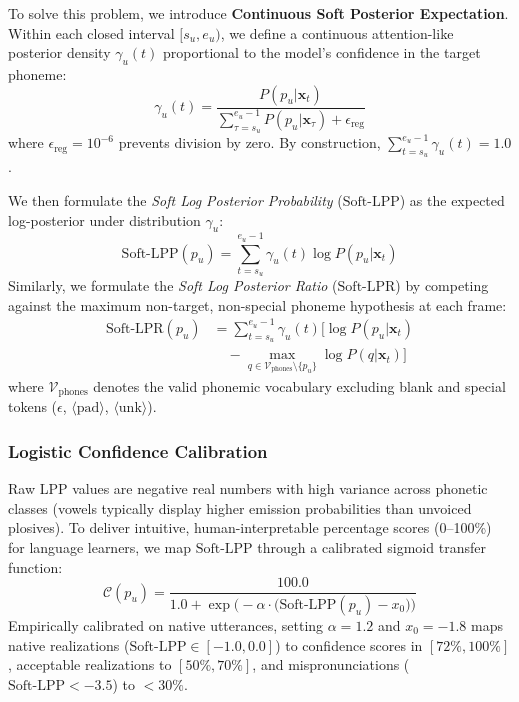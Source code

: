 \documentclass[10pt,conference]{IEEEtran}
\begin{document}
To solve this problem, we introduce \textbf{Continuous Soft Posterior Expectation}. Within each closed interval $[s_u, e_u)$, we define a continuous attention-like posterior density $\gamma_u(t)$ proportional to the model's confidence in the target phoneme:
\begin{equation}
\gamma_u(t) = \frac{P(p_u | \mathbf{x}_t)}{\sum_{\tau = s_u}^{e_u - 1} P(p_u | \mathbf{x}_\tau) + \epsilon_{\text{reg}}}
\label{eq:soft_weight}
\end{equation}
where $\epsilon_{\text{reg}} = 10^{-6}$ prevents division by zero. By construction, $\sum_{t=s_u}^{e_u-1} \gamma_u(t) = 1.0$.

We then formulate the \textit{Soft Log Posterior Probability} ($\text{Soft-LPP}$) as the expected log-posterior under distribution $\gamma_u$:
\begin{equation}
\text{Soft-LPP}(p_u) = \sum_{t=s_u}^{e_u-1} \gamma_u(t) \log P(p_u | \mathbf{x}_t)
\label{eq:soft_lpp}
\end{equation}
Similarly, we formulate the \textit{Soft Log Posterior Ratio} ($\text{Soft-LPR}$) by competing against the maximum non-target, non-special phoneme hypothesis at each frame:
\begin{align}
\text{Soft-LPR}(p_u) &= \sum_{t=s_u}^{e_u-1} \gamma_u(t) \Big[ \log P(p_u | \mathbf{x}_t) \nonumber \\
&\quad - \max_{q \in \mathcal{V}_{\text{phones}} \setminus \{p_u\}} \log P(q | \mathbf{x}_t) \Big]
\label{eq:soft_lpr}
\end{align}
where $\mathcal{V}_{\text{phones}}$ denotes the valid phonemic vocabulary excluding blank and special tokens ($\epsilon$, $\langle\text{pad}\rangle$, $\langle\text{unk}\rangle$).

\subsubsection{Logistic Confidence Calibration}
Raw LPP values are negative real numbers with high variance across phonetic classes (vowels typically display higher emission probabilities than unvoiced plosives). To deliver intuitive, human-interpretable percentage scores (0--100\%) for language learners, we map $\text{Soft-LPP}$ through a calibrated sigmoid transfer function:
\begin{equation}
\mathcal{C}(p_u) = \frac{100.0}{1.0 + \exp\Big(-\alpha \cdot \big(\text{Soft-LPP}(p_u) - x_0\big)\Big)}
\label{eq:logistic_calib}
\end{equation}
Empirically calibrated on native utterances, setting $\alpha = 1.2$ and $x_0 = -1.8$ maps native realizations ($\text{Soft-LPP} \in [-1.0, 0.0]$) to confidence scores in $[72\%, 100\%]$, acceptable realizations to $[50\%, 70\%]$, and mispronunciations ($\text{Soft-LPP} < -3.5$) to $<30\%$.
\end{document}
